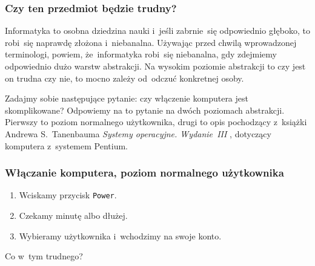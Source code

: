 \documentclass[10pt,t]{beamer}
\begin{document}
\begin{frame}
  \frametitle{Czy ten przedmiot będzie trudny?}


  Informatyka to osobna dziedzina nauki i~jeśli zabrnie~się odpowiednio
  głęboko, to robi~się naprawdę złożona i~niebanalna. Używając przed chwilą
  wprowadzonej terminologi, powiem, że~informatyka robi~się niebanalna, gdy
  zdejmiemy odpowiednio dużo warstw abstrakcji. Na wysokim poziomie
  abstrakcji to czy jest on trudna czy nie, to mocno zależy od~odczuć
  konkretnej osoby.

  Zadajmy sobie następujące pytanie: czy włączenie komputera jest
  skomplikowane? Odpowiemy na to pytanie na dwóch poziomach abstrakcji.
  Pierwszy to poziom normalnego użytkownika, drugi to opis pochodzący
  z~książki Andrewa S.~Tanenbauma \textit{Systemy operacyjne. Wydanie~III}
  \parencite{Tanenbaum-Systemy-operacyjne-Wydanie-III-Pub-2013}, dotyczący
  komputera z~systemem Pentium.

\end{frame}





\begin{frame}
  \frametitle{Włączanie komputera, poziom normalnego użytkownika}


  \begin{enumerate}

  \item Wciskamy przycisk \texttt{Power}.

  \item Czekamy minutę albo dłużej.

  \item Wybieramy użytkownika i~wchodzimy na swoje konto.

  \end{enumerate}



  Co w~tym trudnego?

\end{frame}
\end{document}
